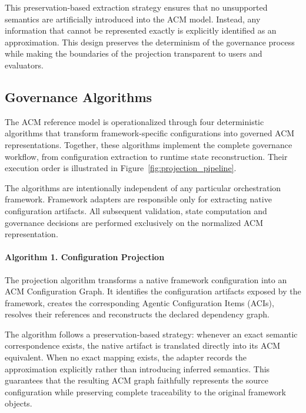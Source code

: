 \documentclass[10pt]{article}
\begin{document}
This preservation-based extraction strategy ensures that no unsupported semantics are artificially introduced into the ACM model. Instead, any information that cannot be represented exactly is explicitly identified as an approximation. This design preserves the determinism of the governance process while making the boundaries of the projection transparent to users and evaluators.

\subsection{Governance Algorithms}
\label{sec:governance_algorithms}

The ACM reference model is operationalized through four deterministic algorithms that transform framework-specific configurations into governed ACM representations. Together, these algorithms implement the complete governance workflow, from configuration extraction to runtime state reconstruction. Their execution order is illustrated in Figure~\ref{fig:projection_pipeline}.

The algorithms are intentionally independent of any particular orchestration framework. Framework adapters are responsible only for extracting native configuration artifacts. All subsequent validation, state computation and governance decisions are performed exclusively on the normalized ACM representation.

\paragraph{Algorithm 1. Configuration Projection}

The projection algorithm transforms a native framework configuration into an ACM Configuration Graph. It identifies the configuration artifacts exposed by the framework, creates the corresponding Agentic Configuration Items (ACIs), resolves their references and reconstructs the declared dependency graph.

The algorithm follows a preservation-based strategy: whenever an exact semantic correspondence exists, the native artifact is translated directly into its ACM equivalent. When no exact mapping exists, the adapter records the approximation explicitly rather than introducing inferred semantics. This guarantees that the resulting ACM graph faithfully represents the source configuration while preserving complete traceability to the original framework objects.
\end{document}
